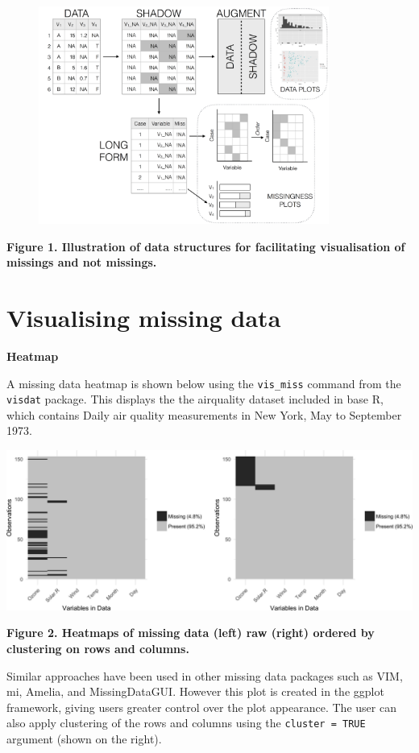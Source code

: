 \documentclass[]{article}
\begin{document}
\begin{figure}[h]
\centering
\includegraphics[width=270pt]{diagram.png}
\end{figure}

\textbf{Figure 1. Illustration of data structures for facilitating
visualisation of missings and not missings.}

\section{Visualising missing data}\label{visualising-missing-data}

\textbf{Heatmap}

A missing data heatmap is shown below using the \texttt{vis\_miss}
command from the \texttt{visdat} package. This displays the the
airquality dataset included in base R, which contains Daily air quality
measurements in New York, May to September 1973.

\includegraphics{jsm2017_njtierney_files/figure-latex/unnamed-chunk-1-1.png}

\textbf{Figure 2. Heatmaps of missing data (left) raw (right) ordered by
clustering on rows and columns.}

Similar approaches have been used in other missing data packages such as
VIM, mi, Amelia, and MissingDataGUI. However this plot is created in the
ggplot framework, giving users greater control over the plot appearance.
The user can also apply clustering of the rows and columns using the
\texttt{cluster\ =\ TRUE} argument (shown on the right).
\end{document}
